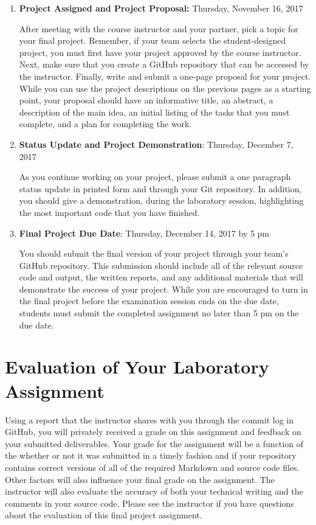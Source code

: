 \documentclass[11pt]{article}
\begin{document}
\begin{enumerate}

  \item {\bf Project Assigned and Project Proposal:} Thursday, November 16, 2017

    After meeting with the course instructor and your partner, pick a topic for your final project. Remember, if your
    team selects the student-designed project, you must first have your project approved by the course instructor. Next,
    make sure that you create a GitHub repository that can be accessed by the instructor. Finally, write and submit a
    one-page proposal for your project. While you can use the project descriptions on the previous pages as a starting
    point, your proposal should have an informative title, an abstract, a description of the main idea, an initial
    listing of the tasks that you must complete, and a plan for completing the work.

  \item {\bf Status Update and Project Demonstration}: Thursday, December 7, 2017

    As you continue working on your project, please submit a one paragraph status update in printed form and through
    your Git repository. In addition, you should give a demonstration, during the laboratory session, highlighting the
    most important code that you have finished.

  \item {\bf Final Project Due Date}: Thursday, December 14, 2017 by 5 pm

    You should submit the final version of your project through your team's GitHub repository. This submission should
    include all of the relevant source code and output, the written reports, and any additional materials that will
    demonstrate the success of your project. While you are encouraged to turn in the final project before the
    examination session ends on the due date, students must submit the completed assignment no later than 5 pm on the
    due date.

\end{enumerate}

\section*{Evaluation of Your Laboratory Assignment}

Using a report that the instructor shares with you through the commit log in GitHub, you will privately received a grade
on this assignment and feedback on your submitted deliverables. Your grade for the assignment will be a function of the
whether or not it was submitted in a timely fashion and if your repository contains correct versions of all of the
required Markdown and source code files. Other factors will also influence your final grade on the assignment. The
instructor will also evaluate the accuracy of both your technical writing and the comments in your source code. Please
see the instructor if you have questions about the evaluation of this final project assignment.
\end{document}
